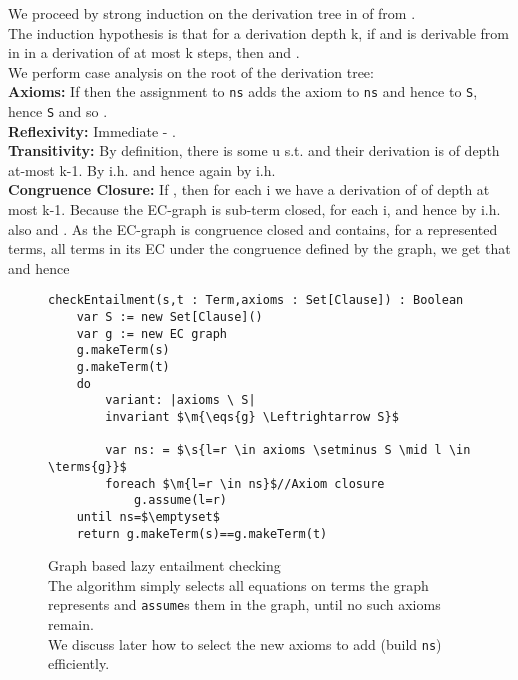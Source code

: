 \noindent
We proceed by strong induction on the derivation tree in  of  from .\\
The induction hypothesis is that for a derivation depth k, if  and  is derivable from  in  in a derivation of at most k steps, then  and .\\
We perform case analysis on the root of the derivation tree:\\
\textbf{Axioms:} If  then the assignment to \lstinline|ns| adds the axiom  to \lstinline|ns| and hence to \lstinline|S|, hence \lstinline|S| and so .\\
\textbf{Reflexivity:} Immediate - .\\
\textbf{Transitivity:} By definition, there is some u s.t.  and their derivation is of depth at-most k-1. By i.h.  and hence again by i.h. \\
\textbf{Congruence Closure:} If , then for each i we have a derivation of  of depth at most k-1.
Because the EC-graph is sub-term closed, for each i,  and hence by i.h. also  and . 
As the EC-graph is congruence closed and contains, for a represented terms, all terms in its EC under the congruence defined by the graph, we get that \\  and hence \\
\QED




\begin{figure}
\begin{lstlisting}
checkEntailment(s,t : Term,axioms : Set[Clause]) : Boolean
	var S := new Set[Clause]()
	var g := new EC graph
	g.makeTerm(s)
	g.makeTerm(t)
	do 
		variant: |axioms \ S|
		invariant $\m{\eqs{g} \Leftrightarrow S}$
		
		var ns: = $\s{l=r \in axioms \setminus S \mid l \in \terms{g}}$
		foreach $\m{l=r \in ns}$//Axiom closure
			g.assume(l=r)
	until ns=$\emptyset$
	return g.makeTerm(s)==g.makeTerm(t)
\end{lstlisting}
\caption{Graph based lazy entailment checking\\
The algorithm simply selects all equations on terms the graph represents and \lstinline|assume|s them in the graph, until no such axioms remain.\\
We discuss later how to select the new axioms to add (build \lstinline|ns|) efficiently.
}
\label{fig_lazy_congruence}
\end{figure}





